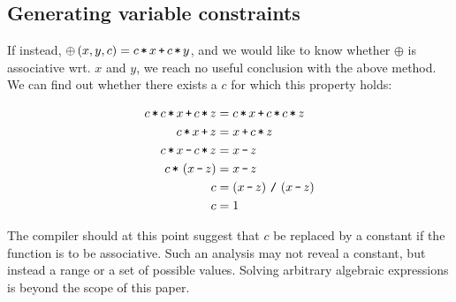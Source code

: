 \subsection{Generating variable constraints}

If instead, $\oplus\p{x,y,c} = c\lt x \lp c \lt y$, and we would like to know
whether $\oplus$ is associative wrt. $x$ and $y$, we reach no useful conclusion
with the above method. We can find out whether there exists a $c$ for which
this property holds:

\begin{align*}
c \lt c \lt x \lp c \lt z &= c \lt x \lp c \lt c \lt z \\
c \lt x \lp z &= x \lp c \lt z \\
c \lt x \lm c \lt z &= x \lm z \\
c \lt \p{x \lm z} &= x \lm z \\
c &= \p{x \lm z} \ld  \p{x \lm z} \\
c &= 1
\end{align*}

The compiler should at this point suggest that $c$ be replaced by a constant if
the function is to be associative. Such an analysis may not reveal a constant,
but instead a range or a set of possible values. Solving arbitrary algebraic
expressions is beyond the scope of this paper. 


